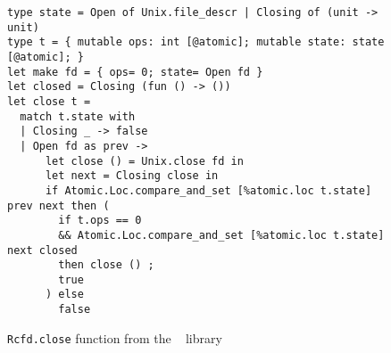 \begin{figure}[tp]
\begin{verbatim}
type state = Open of Unix.file_descr | Closing of (unit -> unit)
type t = { mutable ops: int [@atomic]; mutable state: state [@atomic]; }
let make fd = { ops= 0; state= Open fd }
let closed = Closing (fun () -> ())
let close t =
  match t.state with
  | Closing _ -> false
  | Open fd as prev ->
      let close () = Unix.close fd in
      let next = Closing close in
      if Atomic.Loc.compare_and_set [%atomic.loc t.state] prev next then (
        if t.ops == 0
        && Atomic.Loc.compare_and_set [%atomic.loc t.state] next closed
        then close () ;
        true
      ) else
        false
\end{verbatim}
\caption{\texttt{Rcfd.close} function from the \Eio~\cite{eio} library}
\label{fig:rcfd}
\end{figure}